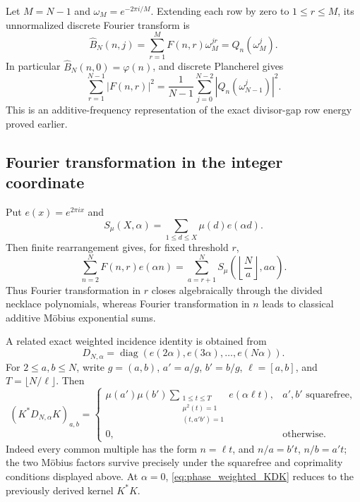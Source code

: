 \documentclass[11pt]{amsart}
\numberwithin{equation}{section}
\theoremstyle{plain}
\theoremstyle{definition}
\theoremstyle{remark}
\newcommand{\mob}{\mu}
\newcommand{\Fsurf}{F}
\begin{document}
Let $M=N-1$ and $\omega_M=e^{-2\pi i/M}$.  Extending each row by zero to $1\le r\le M$, its unnormalized discrete Fourier transform is
\begin{equation}
\widehat B_N(n,j)
=\sum_{r=1}^{M}\Fsurf(n,r)\omega_M^{jr}
=Q_n(\omega_M^j).
\label{eq:BN_row_DFT}
\end{equation}
In particular $\widehat B_N(n,0)=\varphi(n)$, and discrete Plancherel gives
\begin{equation}
\sum_{r=1}^{N-1}|\Fsurf(n,r)|^2
=\frac1{N-1}\sum_{j=0}^{N-2}|Q_n(\omega_{N-1}^j)|^2.
\label{eq:row_plancherel}
\end{equation}
This is an additive-frequency representation of the exact divisor-gap row energy proved earlier.

\subsection{Fourier transformation in the integer coordinate}

Put $e(x)=e^{2\pi i x}$ and
\begin{equation}
S_\mob(X,\alpha)=\sum_{1\le d\le X}\mob(d)e(\alpha d).
\label{eq:mobius_exp_sum}
\end{equation}
Then finite rearrangement gives, for fixed threshold $r$,
\begin{equation}
\sum_{n=2}^{N}\Fsurf(n,r)e(\alpha n)
=\sum_{a=r+1}^{N}
S_\mob\!\left(\left\lfloor\frac Na\right\rfloor,a\alpha\right).
\label{eq:integer_fourier_surface}
\end{equation}
Thus Fourier transformation in $r$ closes algebraically through the divided necklace polynomials, whereas Fourier transformation in $n$ leads to classical additive Möbius exponential sums.

A related exact weighted incidence identity is obtained from
\begin{equation}
D_{N,\alpha}=\operatorname{diag}(e(2\alpha),e(3\alpha),\ldots,e(N\alpha)).
\end{equation}
For $2\le a,b\le N$, write $g=(a,b)$, $a'=a/g$, $b'=b/g$, $\ell=[a,b]$, and $T=\lfloor N/\ell\rfloor$.  Then
\begin{equation}
(K^*D_{N,\alpha}K)_{a,b}
=
\begin{cases}
\mob(a')\mob(b')
\displaystyle\sum_{\substack{1\le t\le T\\\mob^2(t)=1\\(t,a'b')=1}}
e(\alpha\ell t),
& a',b'\text{ squarefree},\\[12pt]
0,&\text{otherwise}.
\end{cases}
\label{eq:phase_weighted_KDK}
\end{equation}
Indeed every common multiple has the form $n=\ell t$, and
$n/a=b't$, $n/b=a't$; the two Möbius factors survive precisely under the squarefree and coprimality conditions displayed above.  At $\alpha=0$, \eqref{eq:phase_weighted_KDK} reduces to the previously derived kernel $K^*K$.
\end{document}
